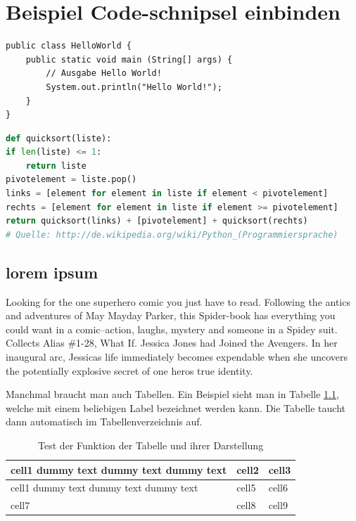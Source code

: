 
\chapter{Beispiel Code-schnipsel einbinden}


\begin{lstlisting}[caption=Code-Beispiel, label=Bsp.1]
public class HelloWorld {
	public static void main (String[] args) {
		// Ausgabe Hello World!
		System.out.println("Hello World!");
	}
}
\end{lstlisting}

\begin{lstlisting}[caption=Python-Code, label=Python-Code, title=Titel des Python-Codes,language=Python]
def quicksort(liste):
if len(liste) <= 1:
	return liste
pivotelement = liste.pop()
links = [element for element in liste if element < pivotelement]
rechts = [element for element in liste if element >= pivotelement]
return quicksort(links) + [pivotelement] + quicksort(rechts)
# Quelle: http://de.wikipedia.org/wiki/Python_(Programmiersprache)
\end{lstlisting}

\section{lorem ipsum}
Looking for the one superhero comic you just have to read. Following the antics and adventures of May Mayday Parker, this Spider-book has everything you could want in a comic--action, laughs, mystery and someone in a Spidey suit. Collects Alias \#1-28, What If. Jessica Jones had Joined the Avengers. In her inaugural arc, Jessicas life immediately becomes expendable when she uncovers the potentially explosive secret of one heros true identity. 

Manchmal braucht man auch Tabellen. Ein Beispiel sieht man in Tabelle \ref{tabelle1}, welche mit einem beliebigen Label bezeichnet werden kann. Die Tabelle taucht dann automatisch im Tabellenverzeichnis auf.

\begin{table}[h!]
\begin{center}
\begin{tabular}{ | m{5cm} | m{1cm}| m{1cm} | } 
\hline
\rowcolor{gray!30}
cell1 dummy text dummy text dummy text& cell2 & cell3 \\ 
\hline
cell1 dummy text dummy text dummy text & cell5 & cell6 \\ 
\hline
cell7 & cell8 & cell9 \\ 
\hline
\end{tabular}
\end{center}
\caption{Test der Funktion der Tabelle und ihrer Darstellung}
\label{tabelle1}
\end{table}


